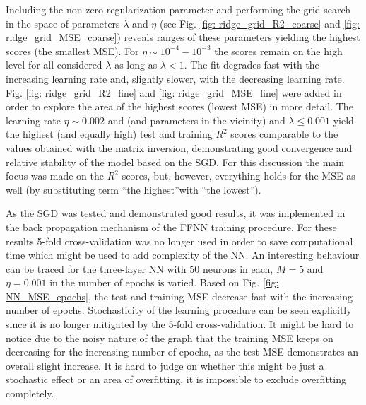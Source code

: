 \documentclass{emulateapj}
\begin{document}
Including the non-zero regularization parameter and performing the grid search in the space of parameters $\lambda$ and $\eta$ (see Fig. \ref{fig: ridge_grid_R2_coarse} and \ref{fig: ridge_grid_MSE_coarse}) reveals ranges of these parameters yielding the highest scores (the smallest MSE). For $\eta\sim10^{-4}-10^{-3}$ the scores remain on the high level for all considered $\lambda$ as long as $\lambda<1$. The fit degrades fast with the increasing learning rate and, slightly slower, with the decreasing learning rate. Fig. \ref{fig: ridge_grid_R2_fine} and \ref{fig: ridge_grid_MSE_fine} were added in order to explore the area of the highest scores (lowest MSE) in more detail. The learning rate $\eta\sim0.002$ and (and parameters in the vicinity) and $\lambda\leq0.001$ yield the highest (and equally high) test and training $R^2$ scores comparable to the values obtained with the matrix inversion, demonstrating good convergence and relative stability of the model based on the SGD. For this discussion the main focus was made on the $R^2$ scores, but, however, everything holds for the MSE as well (by substituting term \textquotedblleft the highest\textquotedblright with \textquotedblleft the lowest\textquotedblright).

As the SGD was tested and demonstrated good results, it was implemented in the back propagation mechanism of the FFNN training procedure. For these results 5-fold cross-validation was no longer used in order to save computational time which might be used to add complexity of the NN. An interesting behaviour can be traced for the three-layer NN with 50 neurons in each, $M=5$ and $\eta=0.001$ in the number of epochs is varied. Based on Fig. \ref{fig: NN_MSE_epochs}, the test and training MSE decrease fast with the increasing number of epochs. Stochasticity of the learning procedure can be seen explicitly since it is no longer mitigated by the 5-fold cross-validation. It might be hard to notice due to the noisy nature of the graph that the training MSE keeps on decreasing for the increasing number of epochs, as the test MSE demonstrates an overall slight increase. It is hard to judge on whether this might be just a stochastic effect or an area of overfitting, it is impossible to exclude overfitting completely. 
\end{document}
